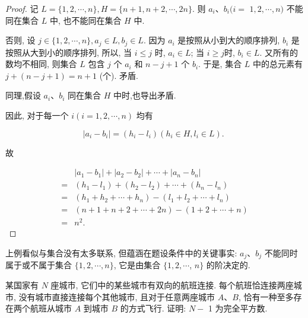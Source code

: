 \begin{proof}
	记 $L=\{1,2, \cdots, n\}, H=\{n+1, n+2, \cdots, 2 n\}$. 则 $a_{i} 、 b_{i}(i=$ $1,2, \cdots, n)$ 不能同在集合 $L$ 中, 也不能同在集合 $H$ 中.

	否则, 设 $j \in\{1,2, \cdots, n\}, a_{j} \in L, b_{j} \in L$. 因为 $a_{i}$ 是按照从小到大的顺序排列, $b_{i}$ 是按照从大到小的顺序排列, 所以, 当 $i \leqslant j$ 时, $a_{i} \in L$; 当 $i \geqslant j$时, $b_{i} \in L$. 又所有的数均不相同, 则集合 $L$ 包含 $j$ 个 $a_{i}$ 和 $n-j+1$ 个 $b_{i}$. 于是, 集合 $L$ 中的总元素有 $j+(n-j+1)=n+1$ (个). 矛盾.

	同理,假设 $a_{i} 、 b_{i}$ 同在集合 $H$ 中时,也导出矛盾.

	因此, 对于每一个 $i(i=1,2, \cdots, n)$ 均有

	$$
		\left|a_{i}-b_{i}\right|=\left(h_{i}-l_{i}\right)\left(h_{i} \in H, l_{i} \in L\right) \text {. }
	$$

	故

	$$
		\begin{aligned}
			  & \left|a_{1}-b_{1}\right|+\left|a_{2}-b_{2}\right|+\cdots+\left|a_{n}-b_{n}\right| \\
			= & \left(h_{1}-l_{1}\right)+\left(h_{2}-l_{2}\right)+\cdots+\left(h_{n}-l_{n}\right) \\
			= & \left(h_{1}+h_{2}+\cdots+h_{n}\right)-\left(l_{1}+l_{2}+\cdots+l_{n}\right)       \\
			= & (n+1+n+2+\cdots+2 n)-(1+2+\cdots+n)                                               \\
			= & n^{2} .
		\end{aligned}
	$$
\end{proof}

\begin{note}
	上例看似与集合没有太多联系, 但蕴涵在题设条件中的关键事实: $a_{j} 、 b_{j}$ 不能同时属于或不属于集合 $\{1,2, \cdots, n\}$, 它是由集合 $\{1,2, \cdots$, $n\}$ 的阶决定的.
\end{note}

\begin{example}
	某国家有 $N$ 座城市, 它们中的某些城市有双向的航班连接. 每个航班恰连接两座城市, 没有城市直接连接每个其他城市, 且对于任意两座城市 $A 、 B$, 恰有一种至多存在两个航班从城市 $A$ 到城市 $B$ 的方式飞行. 证明: $N-$ 1 为完全平方数.
\end{example}

